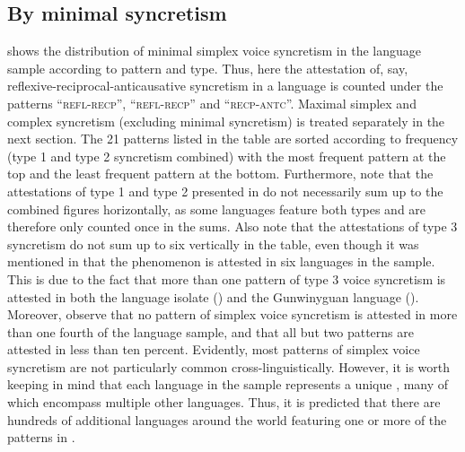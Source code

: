 \subsection{By minimal syncretism} \label{dist:minimal} %
 shows the distribution of minimal simplex voice syncretism in the language sample according to pattern and type. Thus, here the attestation of, say, reflexive-reciprocal-anticausative syncretism in a language is counted under the patterns “\textsc{refl-recp}”, “\textsc{refl-recp}” and “\textsc{recp-antc}”. Maximal simplex and complex syncretism (excluding minimal syncretism) is treated separately in the next section. The 21 patterns listed in the table are sorted according to frequency (type 1 and type 2 syncretism combined) with the most frequent pattern at the top and the least frequent pattern at the bottom. Furthermore, note that the attestations of type 1 and type 2 presented in  do not necessarily sum up to the combined figures horizontally, as some languages feature both types and are therefore only counted once in the sums. Also note that the attestations of type 3 syncretism do not sum up to six vertically in the table, even though it was mentioned in  that the phenomenon is attested in six languages in the sample. This is due to the fact that more than one pattern of type 3 voice syncretism is attested in both the language isolate  () and the Gunwinyguan language  (). Moreover, observe that no pattern of simplex voice syncretism is attested in more than one fourth of the language sample, and that all but two patterns are attested in less than ten percent. Evidently, most patterns of simplex voice syncretism are not particularly common cross-linguistically. However, it is worth keeping in mind that each language in the sample represents a unique , many of which encompass multiple other languages. Thus, it is predicted that there are hundreds of additional languages around the world featuring one or more of the patterns in .

